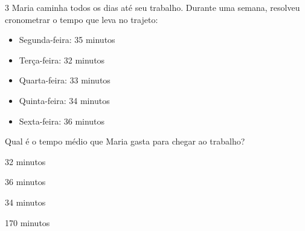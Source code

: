 {{%








\num{3} Maria caminha todos os dias até seu trabalho. Durante uma semana,
resolveu cronometrar o tempo que leva no trajeto:

\begin{multicols}{2}
\begin{itemize}
\item Segunda-feira: 35 minutos

\item Terça-feira: 32 minutos

\item Quarta-feira: 33 minutos

\item Quinta-feira: 34 minutos

\item Sexta-feira: 36 minutos
\end{itemize}
\end{multicols}

Qual é o tempo médio que Maria gasta para chegar ao trabalho?

\begin{multicols}{2}
\begin{escolha}[itemsep=0pt]
\item 32 minutos
\item 36 minutos
\item 34 minutos
\item 170 minutos
\end{escolha}
\end{multicols}

}}
